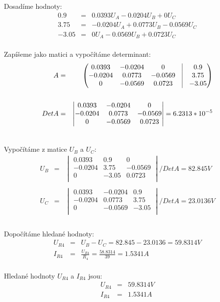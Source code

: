 Dosadíme hodnoty:
    \begin{eqnarray*}
        0.9 &= & 0.0393U_{A} - 0.0204U_{B} + 0 U_{C}\\
        3.75 &= & -0.0204U_{A} + 0.0773U_{B} - 0.0569U_{C}\\
        -3.05 &= & 0U_{A} - 0.0569U_{B} + 0.0723U_{C}\\
	\end{eqnarray*}

Zapíšeme jako matici a vypočítáme determinant:
    \begin{eqnarray*}
        A &= &
			\begin{pmatrix}			
				0.0393 & - 0.0204 & 0 & \vline & 0.9 \\
				- 0.0204 & 0.0773 & - 0.0569 & \vline & 3.75 \\
				0 & - 0.0569 & 0.0723 & \vline & -3.05
			\end{pmatrix} \\
		\\
		Det A &= &
			\begin{vmatrix}
				0.0393 & - 0.0204 & 0\\
				- 0.0204 & 0.0773 & - 0.0569\\
				0 & - 0.0569 & 0.0723 \\
			\end{vmatrix} = 6.2313 * 10^{-5}\\
		\\
	\end{eqnarray*}

Vypočítáme z matice $U_{B}$ a $U_{C}$:
    \begin{eqnarray*}
        U_{B} &= &
            \begin{vmatrix}
				0.0393 & 0.9 & 0\\
				- 0.0204 & 3.75 & - 0.0569\\
				0 & - 3.05 & 0.0723 \\
			\end{vmatrix} / Det A = 82.845 V\\
		\\
        U_{C} &= &
            \begin{vmatrix}
				0.0393 & - 0.0204 & 0.9\\
				- 0.0204 & 0.0773 & 3.75\\
				0 & - 0.0569 & -3.05 \\
			\end{vmatrix} / Det A = 23.0136 V\\
		\\
	\end{eqnarray*}

Dopočítáme hledané hodnoty:
    \begin{eqnarray*}
        U_{R4} &= & U_{B} - U_{C} = 82.845 - 23.0136 = 59.8314 V\\
        I_{R4} &= & \frac{U_{R4}}{R_{4}} = \frac{58.8314}{39} = 1.5341 A\\
	\end{eqnarray*}
	
Hledané hodnoty $U_{R4}$ a $I_{R4}$ jsou:
    \begin{eqnarray*}
        U_{R4} &= & 59.8314 V\\
        I_{R4} &= & 1.5341 A\\
	\end{eqnarray*}